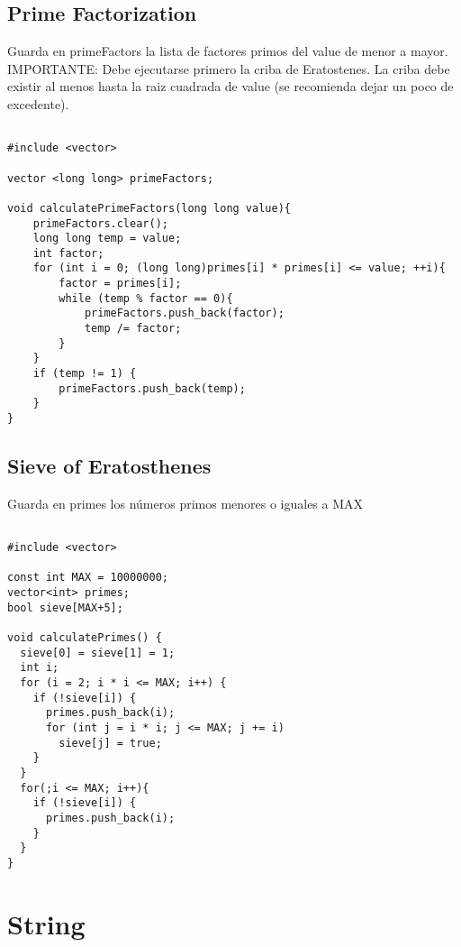 \documentclass[11pt,letterpaper,twocolumn,twosided]{article}
\begin{document}
\subsection{Prime Factorization}
Guarda en primeFactors la lista de factores primos del value de menor a mayor. \\IMPORTANTE: Debe ejecutarse primero la criba de Eratostenes.  La criba debe existir al menos hasta la raiz cuadrada de value (se  recomienda dejar un poco de excedente).
\begin{lstlisting}

#include <vector>

vector <long long> primeFactors;

void calculatePrimeFactors(long long value){
	primeFactors.clear();
	long long temp = value;
	int factor;
	for (int i = 0; (long long)primes[i] * primes[i] <= value; ++i){
		factor = primes[i];
		while (temp % factor == 0){
			primeFactors.push_back(factor);
			temp /= factor;
		}
	}
	if (temp != 1) {
		primeFactors.push_back(temp);
	}
}
\end{lstlisting}

\subsection{Sieve of Eratosthenes}
Guarda en primes los n\'umeros primos menores o iguales a MAX
\begin{lstlisting}

#include <vector>

const int MAX = 10000000;
vector<int> primes;
bool sieve[MAX+5];

void calculatePrimes() {
  sieve[0] = sieve[1] = 1;
  int i;
  for (i = 2; i * i <= MAX; i++) {
    if (!sieve[i]) {
      primes.push_back(i);
      for (int j = i * i; j <= MAX; j += i)
        sieve[j] = true;
    }
  }
  for(;i <= MAX; i++){
  	if (!sieve[i]) {
      primes.push_back(i);
  	}
  }
}
\end{lstlisting}

\section{String}
\end{document}
